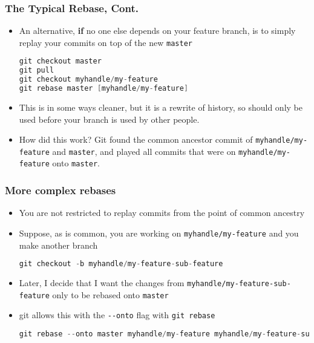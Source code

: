\begin{frame}[fragile]
\frametitle{The Typical Rebase, Cont.}
\begin{itemize}
\item An alternative, \textbf{if} no one else depends on your feature branch, is to simply replay your commits on top of the new \texttt{master}
\begin{lstlisting}[language=C++]
git checkout master
git pull
git checkout myhandle/my-feature
git rebase master [myhandle/my-feature]
\end{lstlisting}
\item This is in some ways cleaner, but it is a rewrite of history, so should only be used before your branch is used by other people.
\item How did this work? Git found the common ancestor commit of \texttt{myhandle/my-feature} and \texttt{master}, and played all commits that were on \texttt{myhandle/my-feature} onto \texttt{master}.
\end{itemize}
\end{frame}

\begin{frame}[fragile]
\frametitle{More complex rebases}
\begin{itemize}
\item You are not restricted to replay commits from the point of common ancestry
\item Suppose, as is common, you are working on \texttt{myhandle/my-feature} and you make another branch
\begin{lstlisting}[language=C++]
git checkout -b myhandle/my-feature-sub-feature
\end{lstlisting}
\item Later, I decide that I want the changes from \texttt{myhandle/my-feature-sub-feature} only to be rebased onto \texttt{master}
\item git allows this with the \lstinline{--onto} flag with \lstinline{git rebase}
\begin{lstlisting}[language=C++]
git rebase --onto master myhandle/my-feature myhandle/my-feature-sub-feature
\end{lstlisting}
\end{itemize}
\end{frame}


